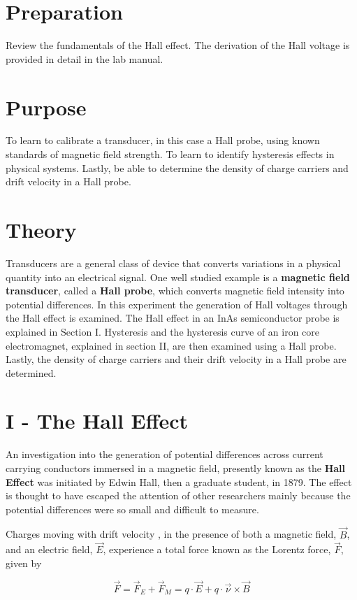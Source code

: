 \section{Preparation}
Review the fundamentals of the Hall effect. The derivation of the Hall voltage is provided in detail in the lab manual.

\section{Purpose}
To learn to calibrate a transducer, in this case a Hall probe, using known standards of magnetic field strength. To learn to identify hysteresis effects in physical systems. Lastly, be able to determine the density of charge carriers and drift velocity in a Hall probe.

\section{Theory}
Transducers are a general class of device that converts variations in a physical quantity into an electrical signal. One well studied example is a {\bf magnetic field transducer}, called a {\bf Hall probe}, which converts magnetic field intensity into potential differences. In this experiment the generation of Hall voltages through the Hall effect is examined. The Hall effect in an InAs semiconductor probe is explained in Section I. Hysteresis and the hysteresis curve of an iron core electromagnet, explained in section II,  are then examined using  a Hall probe. Lastly, the density of charge carriers and their drift velocity in a Hall probe are determined.

\section{I - The Hall Effect}
An investigation into the generation of potential differences across current carrying conductors immersed in a magnetic field, presently known as the {\bf Hall Effect} was initiated by Edwin Hall, then a graduate student, in 1879. The effect is thought to have escaped the attention of other researchers mainly because the potential differences were so small and difficult to measure.

Charges moving with drift velocity , in the presence of both a magnetic field, $\vec{B}$, and an electric field, $\vec{E}$, experience a total force known as the Lorentz force, $\vec{F}$, given by 

\begin{equation}
\vec{F}=\vec{F}_E+\vec{F}_M=q\cdot \vec{E}+q\cdot \vec{\nu}\times \vec{B}
\label{equ:he1}
\end{equation}

